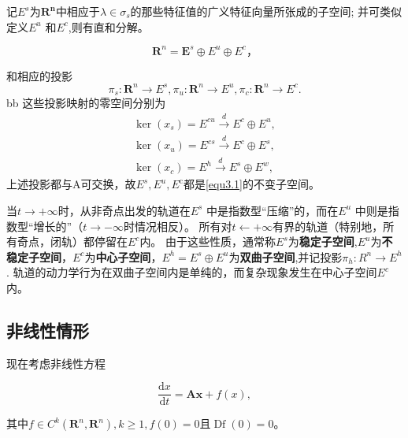 记$E ^ { s }$为$\mathbf {
		R} ^ { \boldsymbol { n} }$中相应于$\lambda \in \sigma _ { s }$的那些特征值的广义特征向量所张成的子空间;
并可类似定义\(E^u\) 和\(E^c\),则有直和分解。

\begin{equation}
	\mathbf { R } ^ { n } = \boldsymbol { E } ^ { s }\oplus E ^ { u } \oplus E ^ { c }，
	\label{eq:1.3.4}
\end{equation}

和相应的投影
\[
	\pi_{s} : \mathbf{R}^ { n } \rightarrow E ^ { s },
	\pi _ { u } : \mathbf { R } ^ { n } \rightarrow E ^ { u },
	\pi _ { c } : \mathbf { R } ^ { n } \rightarrow E ^ {  c  }.
\]
bb
这些投影映射的零空间分别为
\begin{align}
	\operatorname { ker } \left( x _ { s } \right) = E ^ { cu } \stackrel { d } { \longrightarrow } E ^ { c } \oplus E ^ { u }, \\
	\operatorname { ker } \left( x _ { u } \right) = E ^ { cs } \stackrel { d } { \longrightarrow } E ^ { c } \oplus E ^ {s },  \\
	\operatorname { ker } \left( x _ { c } \right) = E ^ { h } \stackrel { d } { \longrightarrow } E ^ { s } \oplus E ^ { w },
\end{align}
上述投影都与A可交换，故$E ^ { s } , E ^ { u } , E ^ { \mathrm { c } }$都是\ref{equ3.1}的不变子空间。


当$t \rightarrow + \infty$时，从非奇点出发的轨道在\(E^s\) 中是指数型“压缩”的，而在\(E^u\) 中则是指数型“增长的”（$t \rightarrow - \infty$时情况相反）。
所有对$t \leftarrow + \infty$有界的轨道（特别地，所有奇点，闭轨）都停留在\(E^c\)内。
由于这些性质，通常称\(E^s\)为\textbf{稳定子空间},\(E^u\)为\textbf{不稳定子空间}，\(E^c\)为\textbf{中心子空间}，$E ^ { h} = E ^ { s } \oplus E ^ { u}$为\textbf{双曲子空间},并记投影$\pi _ { h } : R ^ { n } \rightarrow E^h$.
轨道的动力学行为在双曲子空间内是单纯的，而复杂现象发生在中心子空间\(E^c\)内。

\subsection{非线性情形}

现在考虑非线性方程

\begin{equation}
	\frac { \mathrm { d } x } { \mathrm { d } t } = \mathbf { A } \boldsymbol { x } + f ( x ),
	\label{eq:1.3.5}
\end{equation}

其中$f \in C ^ { k } \left( \mathbf{R} ^ { n } , \mathbf{R} ^ { n } \right) , k \geqslant 1 , f ( 0 ) = 0$且$\operatorname { Df } ( 0 ) = 0$。

